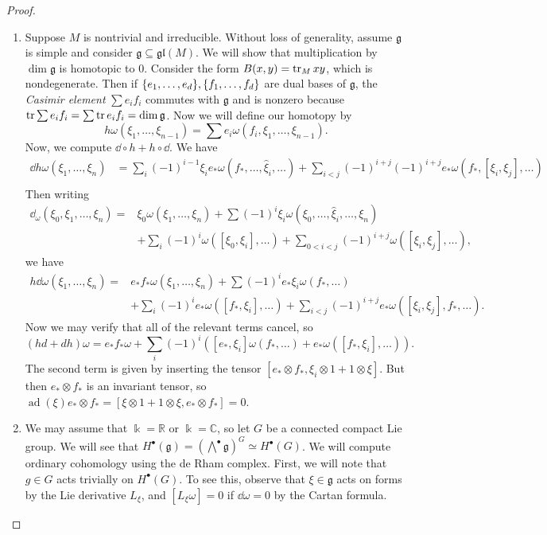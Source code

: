 \documentclass[leqno, openany]{memoir}
\theoremstyle{definition}
\theoremstyle{remark}
\theoremstyle{plain}
\theoremstyle{definition}
\theoremstyle{remark}
\newcommand{\R}{\mathbb{R}}
\newcommand{\C}{\mathbb{C}}
\renewcommand{\k}{\Bbbk}
\newcommand{\mf}[1]{\mathfrak{#1}}
\newcommand{\wh}[1]{\widehat{#1}}
\DeclareMathOperator{\ad}{ad}
\begin{document}
\begin{proof}\leavevmode \begin{enumerate} \item Suppose $M$ is nontrivial and
    irreducible. Without loss of generality, assume $\mf{g}$ is simple and
    consider $\mf{g} \subseteq \mf{gl}(M)$. We will show that multiplication by
    $\dim \mf{g}$ is homotopic to $0$. Consider the form $B(x, y) = \tr_M xy$,
    which is nondegenerate. Then if $\qty{e_1, \ldots, e_d}, \qty{f_1, \ldots,
    f_d}$ are dual bases of $\mf{g}$, the \textit{Casimir element} $\sum e_i
    f_i$ commutes with $\mf{g}$ and is nonzero because $\tr \sum e_i f_i = \sum
    \tr e_i f_i = \dim \mf{g}$. Now we will define our homotopy by \[ h \omega
        (\xi_1, \ldots, \xi_{n-1}) = \sum e_i \omega (f_i, \xi_1, \ldots,
        \xi_{n-1}). \] Now, we compute $\dd \circ h + h \circ \dd$. We have
        \begin{align*} \dd h \omega (\xi_1, \ldots, \xi_n) &= \sum_i
            {(-1)}^{i-1} \xi_i e_* \omega (f_*, \ldots, \wh{\xi}_i, \ldots) +
            \sum_{i < j} {(-1)}^{i+j} {(-1)}^{i+j} e_* \omega (f_*, [\xi_i,
            \xi_j], \ldots) \\ \end{align*} Then writing \begin{align*}
            \dd_{\omega} (\xi_0, \xi_1, \ldots, \xi_n) ={} &\xi_0 \omega
            (\xi_1, \ldots, \xi_n) + \sum {(-1)}^i \xi_i \omega (\xi_0, \ldots,
            \wh{\xi}_i, \ldots, \xi_n)  \\ &+ \sum_i {(-1)}^i \omega ([\xi_0,
            \xi_i], \ldots) + \sum_{0 < i < j} {(-1)}^{i+j} \omega ([\xi_i,
            \xi_j], \ldots), \end{align*} we have \begin{align*} h
            \dd{\omega}(\xi_1, \ldots, \xi_n) ={} &e_* f_* \omega (\xi_1,
            \ldots, \xi_n) + \sum {(-1)}^i e_* \xi_i \omega (f_*, \ldots) \\ &+
            \sum_i {(-1)}^i e_* \omega ([f_*, \xi_i], \ldots) + \sum_{i < j}
            {(-1)}^{i+j} e_* \omega ([\xi_i, \xi_j], f_*, \ldots).
            \end{align*} Now we may verify that all of the relevant terms
            cancel, so \[ (hd + dh) \omega = e_* f_* \omega + \sum_i {(-1)}^i (
            [e_*, \xi_i] \omega (f_*, \ldots) + e_* \omega ([f_*, \xi_i],
        \ldots) ). \] The second term is given by inserting the tensor $[e_*
        \otimes f_*, \xi_i \otimes 1 + 1 \otimes \xi]$. But then $e_* \otimes
        f_*$ is an invariant tensor, so $\ad (\xi) e_* \otimes f_* = [\xi
        \otimes 1 + 1 \otimes \xi, e_* \otimes f_*] = 0$.  \item We may assume
        that $\k = \R$ or $\k = \C$, so let $G$ be a connected compact Lie
        group. We will see that $H^{\bullet}(\mf{g}) = {(\bigwedge^{\bullet}
        \mf{g})}^G \simeq H^{\bullet}(G)$. We will compute ordinary cohomology
        using the de Rham complex. First, we will note that $g \in G$ acts
        trivially on $H^{\bullet}(G)$. To see this, observe that $\xi \in
        \mf{g}$ acts on forms by the Lie derivative $L_{\xi}$, and $[L_{\xi}
        \omega] = 0$ if $\dd{\omega} = 0$ by the Cartan formula.


\end{enumerate}
\end{proof}
\end{document}
